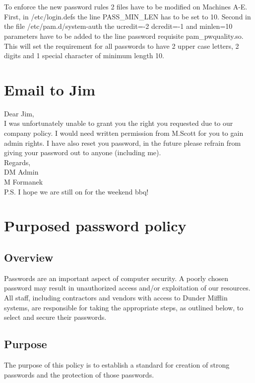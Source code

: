 \documentclass[11pt,onside]{article}
\begin{document}
\section{}
To enforce the new password rules 2 files have to be modified on Machines A-E. First,  in /etc/login.defs the line PASS\_MIN\_LEN has to be set to 10. Second in the file /etc/pam.d/system-auth the ucredit=-2 dcredit=-1 and minlen=10 parameters have to be added to the line password requisite pam\_pwquality.so. This will set the requirement for all passwords to have 2 upper case letters, 2 digits and 1 special character of minimum length 10. 
\section{Email to Jim}
Dear Jim, \\
I was unfortunately unable to grant you the right you requested due to our company policy. I would need written permission from M.Scott for you to gain admin rights.
I have also reset you password, in the future please refrain from giving your password out to anyone (including me).\\

Regards,\\

DM Admin\\

M Formanek\\

P.S. I hope we are still on for the weekend bbq!   
\section{Purposed password policy}
\setcounter{section}{1}
\subsection{Overview}
Passwords are an important aspect of computer security. A poorly chosen password may result
in unauthorized access and/or exploitation of our resources. All staff, including contractors and
vendors with access to Dunder Mifflin systems, are responsible for taking the appropriate
steps, as outlined below, to select and secure their passwords. 
\subsection{Purpose}
The purpose of this policy is to establish a standard for creation of strong passwords and the
protection of those passwords.
\end{document}
